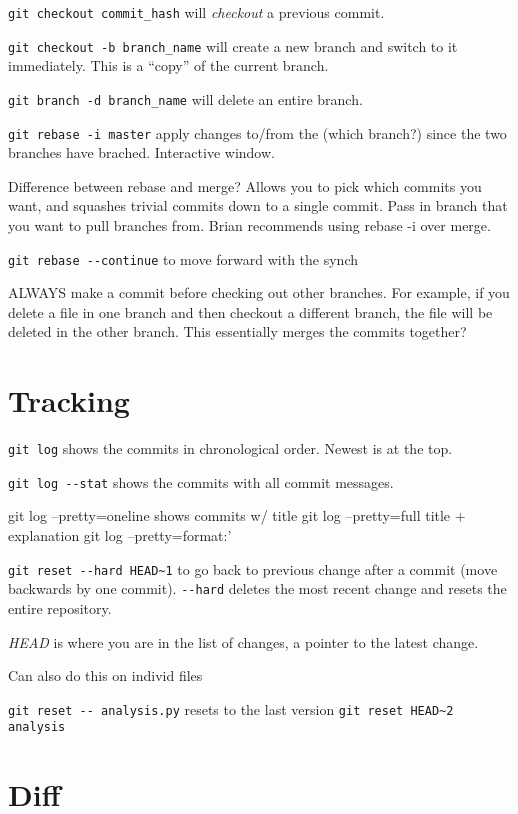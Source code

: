 \documentclass{article}
\begin{document}
\verb|git checkout commit_hash| will \emph{checkout} a previous commit.

\verb|git checkout -b branch_name| will create a new branch and switch to it
immediately. This is a ``copy'' of the current branch.

\verb|git branch -d branch_name| will delete an entire branch.

\verb|git rebase -i master| apply changes to/from the (which branch?) since the two branches have brached. Interactive window.

Difference between rebase and merge? Allows you to pick which commits you want, and squashes trivial commits down to a single commit. Pass in branch that you want to pull branches from. Brian recommends using rebase -i over merge.

\verb|git rebase --continue| to move forward with the synch

ALWAYS make a commit before checking out other branches. For example, if you delete a file in one branch and then checkout a different branch, the file will be deleted in the other branch. This essentially merges the commits together?

\section{Tracking}

\verb|git log| shows the commits in chronological order. Newest is at the top.

\verb|git log --stat| shows the commits with all commit messages.

git log --pretty=oneline shows commits w/ title
git log --pretty=full title + explanation
git log --pretty=format:'%

\verb|git reset --hard HEAD~1| to go back to previous change after a commit (move backwards by one commit). \verb|--hard| deletes the most recent change and resets the entire repository.



\emph{HEAD} is where you are in the list of changes, a pointer to the latest change.

Can also do this on individ files

\verb|git reset -- analysis.py| resets to the last version
\verb|git reset HEAD~2 analysis|

\section{Diff}
\end{document}
